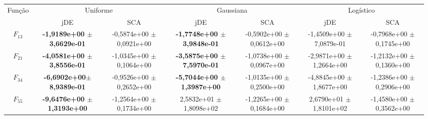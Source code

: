 \begin{center}
\renewcommand{\arraystretch}{2.0}
{\scriptsize
\setlength\LTleft{-10pt}
\begin{longtable}{c|c c c c c c}
\\ %
\multirow{2}{*}{Função} & \multicolumn{2}{c}{Uniforme} & \multicolumn{2}{c}{Gaussiana} & 
\multicolumn{2}{c}{Logístico} \\
& jDE & SCA & jDE & SCA & jDE & SCA\\
\hline \endhead
$F_{13}$ & \makecell{{\bf-1,9189e+00 $\pm$}\\{\bf3,6629e-01}} 
      & \makecell{{-0,5874e+00 $\pm$} \\ {0,0921e+00}} 
      & \makecell{{\bf-1,7748e+00 $\pm$} \\ {\bf3,9848e-01}}
      & \makecell{{-0,5902e+00  $\pm$} \\ {0,0612e+00} }
      & \makecell{{-1,4509e+00 $\pm$ }\\ {7,0879e-01}} 
      & \makecell{{-0,7968e+00 $\pm$} \\ {0,1745e+00}}\\ %

$F_{21}$  & \makecell{{\bf-4,0581e+00 $\pm$}\\{\bf3,8556e-01}}
      & \makecell{{-1,0345e+00 $\pm$} \\ {0,1064e+00}} 
      & \makecell{{\bf-3,5875e+00 $\pm$} \\ {\bf7,5970e-01}}
      & \makecell{{-1,0738e+00 $\pm$} \\ {0,0967e+00} }
      & \makecell{{-2,9871e+00 $\pm$} \\ {1,2664e+00}}
      & \makecell{{-1,2132e+00 $\pm$ }\\ {0,1360e+00}} \\

$F_{34}$  & \makecell{{\bf-6,6902e+00$\pm$}\\{\bf8,9389e-01}} 
      & \makecell{{-0,9526e+00 $\pm$} \\ {0,2652e+00}} 
      & \makecell{{\bf-5,7044e+00 $\pm$} \\ {\bf1,3987e+00}}
      & \makecell{{-1,0135e+00 $\pm$} \\ {0,2500e+00} }
      & \makecell{{-4,8845e+00 $\pm$} \\ {1,8677e+00}}
      & \makecell{{-1,2386e+00 $\pm$ }\\ {0,2906e+00}} \\
        
$F_{55}$ & \makecell{{\bf-9,6476e+00 $\pm$} \\ {\bf1,3193e+00}} 
      & \makecell{{-1,2564e+00 $\pm$} \\ {0,1734e+00}} 
      & \makecell{{2,5832e+01 $\pm$} \\ {1,8098e+02} }
      & \makecell{{-1,2265e+00 $\pm$} \\ {0,1684e+00} }
      & \makecell{{2,6790e+01  $\pm$} \\ {1,8101e+02}}
      & \makecell{{-1,4580e+00 $\pm$ }\\ {0,3562e+00}} \\
    

\end{longtable}}
\end{center}
